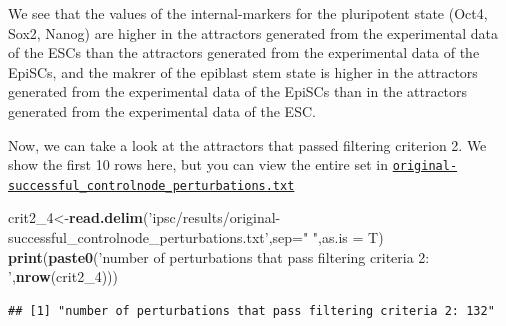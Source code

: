 \documentclass[
]{book}
\newenvironment{Shaded}{\begin{snugshade}}{\end{snugshade}}
\newcommand{\DataTypeTok}[1]{\textcolor[rgb]{0.13,0.29,0.53}{#1}}
\newcommand{\DecValTok}[1]{\textcolor[rgb]{0.00,0.00,0.81}{#1}}
\newcommand{\KeywordTok}[1]{\textcolor[rgb]{0.13,0.29,0.53}{\textbf{#1}}}
\newcommand{\NormalTok}[1]{#1}
\newcommand{\OperatorTok}[1]{\textcolor[rgb]{0.81,0.36,0.00}{\textbf{#1}}}
\newcommand{\StringTok}[1]{\textcolor[rgb]{0.31,0.60,0.02}{#1}}
\begin{document}
We see that the values of the internal-markers for the pluripotent state (Oct4, Sox2, Nanog) are higher in the attractors generated from the experimental data of the ESCs than the attractors generated from the experimental data of the EpiSCs, and the makrer of the epiblast stem state is higher in the attractors generated from the experimental data of the EpiSCs than in the attractors generated from the experimental data of the ESC.

Now, we can take a look at the attractors that passed filtering criterion 2. We show the first 10 rows here, but you can view the entire set in \href{https://github.com/VeraLiconaResearchGroup/Netisce/blob/main/ipsc_validation/results/original-successful_controlnode_perturbations.txt}{\texttt{original-successful\_controlnode\_perturbations.txt}}

\begin{Shaded}
\begin{Highlighting}[]
\NormalTok{crit2_}\DecValTok{4}\NormalTok{<-}\KeywordTok{read.delim}\NormalTok{(}\StringTok{'ipsc/results/original-successful_controlnode_perturbations.txt'}\NormalTok{,}\DataTypeTok{sep=}\StringTok{" "}\NormalTok{,}\DataTypeTok{as.is =}\NormalTok{ T)}
\KeywordTok{print}\NormalTok{(}\KeywordTok{paste0}\NormalTok{(}\StringTok{'number of perturbations that pass filtering criteria 2: '}\NormalTok{,}\KeywordTok{nrow}\NormalTok{(crit2_}\DecValTok{4}\NormalTok{)))}
\end{Highlighting}
\end{Shaded}

\begin{verbatim}
## [1] "number of perturbations that pass filtering criteria 2: 132"
\end{verbatim}

\begin{Shaded}
\end{Shaded}
\end{document}
